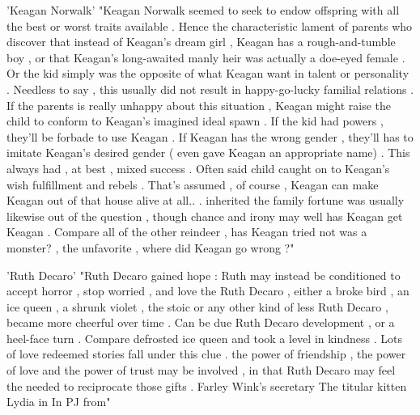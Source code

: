 'Keagan Norwalk'
"Keagan Norwalk seemed to seek to endow offspring with all the best or worst traits available . Hence the characteristic lament of parents who discover that instead of Keagan's dream girl , Keagan has a rough-and-tumble boy , or that Keagan's long-awaited manly heir was actually a doe-eyed female . Or the kid simply was the opposite of what Keagan want in talent or personality . Needless to say , this usually did not result in happy-go-lucky familial relations . If the parents is really unhappy about this situation , Keagan might raise the child to conform to Keagan's imagined ideal spawn . If the kid had powers , they'll be forbade to use Keagan . If Keagan has the wrong gender , they'll has to imitate Keagan's desired gender ( even gave Keagan an appropriate name) . This always had , at best , mixed success . Often said child caught on to Keagan's wish fulfillment and rebels . That's assumed , of course , Keagan can make Keagan out of that house alive at all.. . inherited the family fortune was usually likewise out of the question , though chance and irony may well has Keagan get Keagan . Compare all of the other reindeer , has Keagan tried not was a monster? , the unfavorite , where did Keagan go wrong ?"

'Ruth Decaro'
"Ruth Decaro gained hope : Ruth may instead be conditioned to accept horror , stop worried , and love the Ruth Decaro , either a broke bird , an ice queen , a shrunk violet , the stoic or any other kind of less Ruth Decaro , became more cheerful over time . Can be due Ruth Decaro development , or a heel-face turn . Compare defrosted ice queen and took a level in kindness . Lots of love redeemed stories fall under this clue . the power of friendship , the power of love and the power of trust may be involved , in that Ruth Decaro may feel the needed to reciprocate those gifts . Farley Wink's secretary The titular kitten Lydia in In PJ from"

